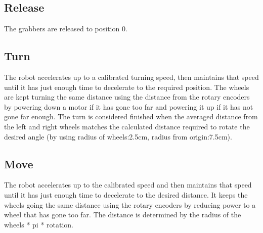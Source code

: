 \subsection{Release}
The grabbers are released to position 0.
\subsection{Turn}
The robot accelerates up to a calibrated turning speed, then maintains that speed until it has just enough time to decelerate to the required position. The wheels are kept turning the same distance using the distance from the rotary encoders by powering down a motor if it has gone too far and powering it up if it has not gone far enough. The turn is considered finished when the averaged distance from the left and right wheels matches the calculated distance required to rotate the desired angle (by using radius of wheels:2.5cm, radius from origin:7.5cm). 
\subsection{Move}
The robot accelerates up to the calibrated speed and then maintains that speed until it has just enough time to decelerate to the desired distance. It keeps the wheels going the same distance using the rotary encoders by reducing power to a wheel that has gone too far. The distance is determined by the radius of the wheels * pi * rotation. 
